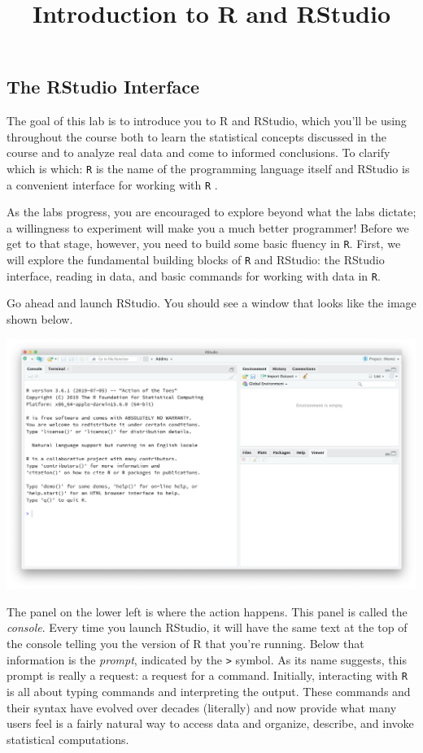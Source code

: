\documentclass[
]{article}
\title{Introduction to R and RStudio}
\author{}
\date{\vspace{-2.5em}}
\begin{document}
\maketitle

{
\setcounter{tocdepth}{2}
\tableofcontents
}
\hypertarget{the-rstudio-interface}{%
\subsection{The RStudio Interface}\label{the-rstudio-interface}}

The goal of this lab is to introduce you to R and RStudio, which you'll be using throughout the course both to learn the statistical concepts discussed in the course and to analyze real data and come to informed conclusions. To clarify which is which: \texttt{R} is the name of the programming language itself and RStudio is a convenient interface for working with \texttt{R} .

As the labs progress, you are encouraged to explore beyond what the labs dictate; a willingness to experiment will make you a much better programmer! Before we get to that stage, however, you need to build some basic fluency in \texttt{R}. First, we will explore the fundamental building blocks of \texttt{R} and RStudio: the RStudio interface, reading in data, and basic commands for working with data in \texttt{R}.

Go ahead and launch RStudio. You should see a window that looks like the image shown below.

\includegraphics{img/r-interface-2020.png}

The panel on the lower left is where the action happens. This panel is called the \emph{console}. Every time you launch RStudio, it will have the same text at the top of the console telling you the version of R that you're running. Below that information is the \emph{prompt}, indicated by the \texttt{\textgreater{}} symbol. As its name suggests, this prompt is really a request: a request for a command. Initially, interacting with \texttt{R} is all about typing commands and interpreting the output. These commands and their syntax have evolved over decades (literally) and now provide what many users feel is a fairly natural way to access data and organize, describe, and invoke statistical computations.
\end{document}
